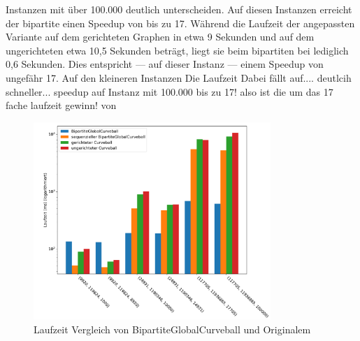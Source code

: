 Instanzen mit über 100.000 deutlich unterscheiden. Auf diesen Instanzen erreicht
der bipartite \gc{} einen Speedup von bis zu 17. 
Während die Laufzeit der angepassten \cb{} Variante auf dem gerichteten Graphen in etwa 9 Sekunden
und auf dem ungerichteten etwa 10,5 Sekunden beträgt, liegt sie beim bipartiten \gc{} bei lediglich 
0,6 Sekunden. Dies entspricht --- auf dieser Instanz ---  einem Speedup von ungefähr 17.
Auf den kleineren Instanzen 
Die Laufzeit 
Dabei fällt auf.... deutlcih schneller... speedup auf Instanz mit 100.000 
bis zu 17! also ist die um das 17 fache laufzeit gewinn!
von
\begin{figure}
\centering
	\includegraphics[width = 0.8\textwidth]{figures/speedup.pdf}
	\caption{Laufzeit Vergleich von BipartiteGlobalCurveball und Originalem \cb{}}
	\label{fig:speedup_komplett}
\end{figure}

